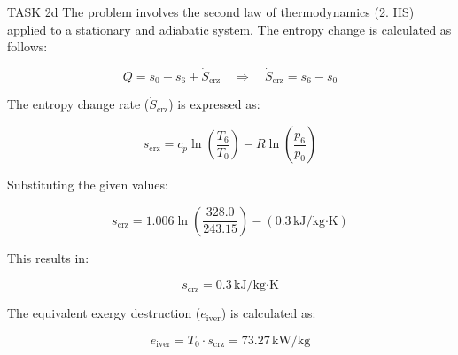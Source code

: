 TASK 2d  
The problem involves the second law of thermodynamics (2. HS) applied to a stationary and adiabatic system. The entropy change is calculated as follows:

\[
Q = s_0 - s_6 + \dot{S}_{\text{crz}} \quad \Rightarrow \quad \dot{S}_{\text{crz}} = s_6 - s_0
\]

The entropy change rate (\( \dot{S}_{\text{crz}} \)) is expressed as:

\[
s_{\text{crz}} = c_{p} \ln \left( \frac{T_6}{T_0} \right) - R \ln \left( \frac{p_6}{p_0} \right)
\]

Substituting the given values:

\[
s_{\text{crz}} = 1.006 \ln \left( \frac{328.0}{243.15} \right) - (0.3 \, \text{kJ/kg·K})
\]

This results in:

\[
s_{\text{crz}} = 0.3 \, \text{kJ/kg·K}
\]

The equivalent exergy destruction (\( e_{\text{iver}} \)) is calculated as:

\[
e_{\text{iver}} = T_0 \cdot s_{\text{crz}} = 73.27 \, \text{kW/kg}
\]